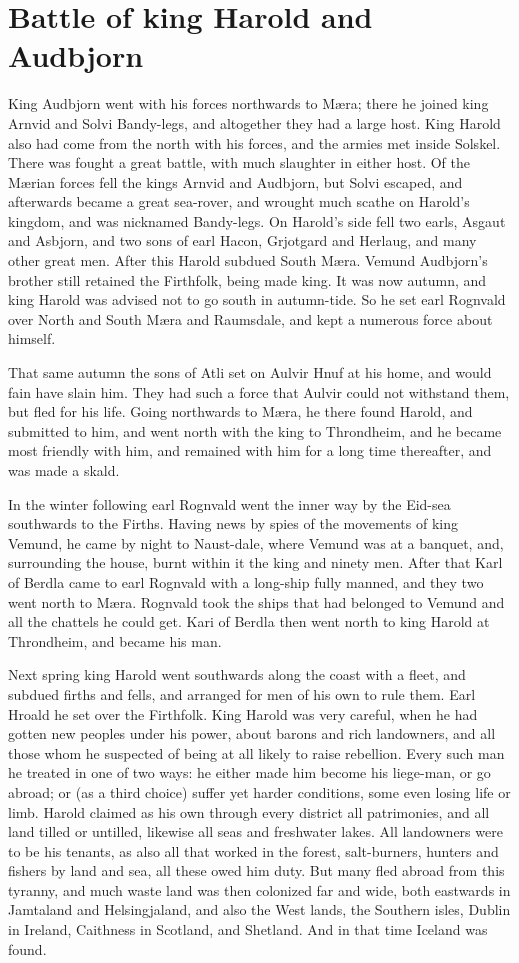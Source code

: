 \chapter{Battle of king Harold and Audbjorn}
King Audbjorn went with his forces northwards to M\ae ra; there he joined king Arnvid and Solvi Bandy-legs, and altogether they had a large host. King Harold also had come from the north with his forces, and the armies met inside Solskel. There was fought a great battle, with much slaughter in either host. Of the M\ae rian forces fell the kings Arnvid and Audbjorn, but Solvi escaped, and afterwards became a great sea-rover, and wrought much scathe on Harold's kingdom, and was nicknamed Bandy-legs. On Harold's side fell two earls, Asgaut and Asbjorn, and two sons of earl Hacon, Grjotgard and Herlaug, and many other great men. After this Harold subdued South M\ae ra. Vemund Audbjorn's brother still retained the Firthfolk, being made king. It was now autumn, and king Harold was advised not to go south in autumn-tide. So he set earl Rognvald over North and South M\ae ra and Raumsdale, and kept a numerous force about himself.

That same autumn the sons of Atli set on Aulvir Hnuf at his home, and would fain have slain him. They had such a force that Aulvir could not withstand them, but fled for his life. Going northwards to M\ae ra, he there found Harold, and submitted to him, and went north with the king to Throndheim, and he became most friendly with him, and remained with him for a long time thereafter, and was made a skald.

In the winter following earl Rognvald went the inner way by the Eid-sea southwards to the Firths. Having news by spies of the movements of king Vemund, he came by night to Naust-dale, where Vemund was at a banquet, and, surrounding the house, burnt within it the king and ninety men. After that Karl of Berdla came to earl Rognvald with a long-ship fully manned, and they two went north to M\ae ra. Rognvald took the ships that had belonged to Vemund and all the chattels he could get. Kari of Berdla then went north to king Harold at Throndheim, and became his man.

Next spring king Harold went southwards along the coast with a fleet, and subdued firths and fells, and arranged for men of his own to rule them. Earl Hroald he set over the Firthfolk. King Harold was very careful, when he had gotten new peoples under his power, about barons and rich landowners, and all those whom he suspected of being at all likely to raise rebellion. Every such man he treated in one of two ways: he either made him become his liege-man, or go abroad; or (as a third choice) suffer yet harder conditions, some even losing life or limb. Harold claimed as his own through every district all patrimonies, and all land tilled or untilled, likewise all seas and freshwater lakes. All landowners were to be his tenants, as also all that worked in the forest, salt-burners, hunters and fishers by land and sea, all these owed him duty. But many fled abroad from this tyranny, and much waste land was then colonized far and wide, both eastwards in Jamtaland and Helsingjaland, and also the West lands, the Southern isles, Dublin in Ireland, Caithness in Scotland, and Shetland. And in that time Iceland was found.
